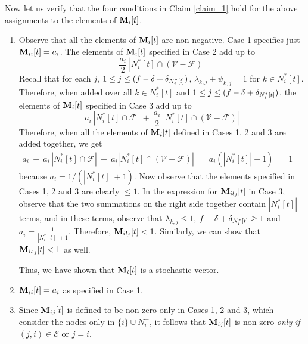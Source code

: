 \documentclass[letterpaper, 12pt]{article}
\newcommand{\scriptf}{\mathcal{F}}
\newcommand{\scripte}{\mathcal{E}}
\newcommand{\scriptv}{\mathcal{V}}
\begin{document}
Now let us verify that the four conditions in Claim \ref{claim_1} hold
for the above assignments to the elements of ${\bf M}_i[t]$.
\begin{enumerate}
\item
Observe that all the elements of ${\bf M}_i[t]$ are non-negative.
Case 1 specifies just ${\bf M}_{ii}[t]=a_i$.
The elements of ${\bf M}_i[t]$ specified in Case 2 
add up to
\[
\frac{a_i}{2} ~ |N_i^*[t]\cap (\scriptv-\scriptf)|
\]
Recall that for each $j$, $1\leq j\leq (f-\delta+\delta_{N_i^*[t]})$,
$\lambda_{k,j}+\psi_{k,j}=1$ for $k\in N_i^*[t]$.
Therefore, when added over all $k\in N_i^*[t]$
and $1\leq j\leq (f-\delta+\delta_{N_i^*[t]})$, the elements of ${\bf M}_i[t]$ specified in Case 3 
add up to
\[
a_i ~ |N_i^*[t]\cap \scriptf| ~+~
\frac{a_i}{2} ~ |N_i^*[t]\cap (\scriptv-\scriptf)|
\]
Therefore, when all the elements of ${\bf M}_i[t]$ defined in Cases 1,
2 and 3 are added together, we get
\begin{eqnarray*}
a_i ~+~ a_i\, |N_i^*[t]\cap\scriptf|
~+~ 
a_i  |N_i^*[t]\cap (\scriptv-\scriptf)| ~=~
 a_i (|N_i^*[t]|+1) ~=~1
&&
\end{eqnarray*}
because 
$a_i=1/(|N_i^*[t]|+1)$.
Now observe that the elements specified in Cases 1, 2 and 3 are clearly
$\leq 1$.
In the expression for ${\bf M}_{il_j}[t]$ in Case 3, observe that the two
summations on the right side together contain $|N_i^*[t]|$ terms,
and in these terms, observe that $\lambda_{k,j}\leq 1$,
$f-\delta+\delta_{N_i^*[t]}\geq 1$ and $a_i=\frac{1}{|N_i^*[t]|+1}$. Therefore,
${\bf M}_{il_j}[t]<1$.
Similarly, we can show that ${\bf M}_{is_j}[t]<1$ as well.

Thus, we have shown that ${\bf M}_i[t]$ is a stochastic vector.

\item ${\bf M}_{ii}[t]=a_i$ as specified in Case 1.

\item Since ${\bf M}_{ij}[t]$ is defined to be non-zero only in Cases 1, 2 and 3,
which consider the nodes only in $\{i\}\cup N_i^-$, it follows
that ${\bf M}_{ij}[t]$ is non-zero {\em only if} $(j,i)\in\scripte$
or $j=i$.


\end{enumerate}
\end{document}
